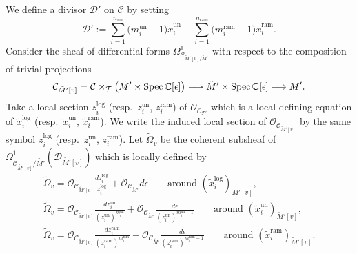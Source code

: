 \documentclass[pdftex]{sigma}
\numberwithin{equation}{section}
\newcommand\Spec{\mathop{\rm Spec}\nolimits}
\begin{document}
We define a divisor ${\mathcal D}'$ on ${\mathcal C}$
by setting
\[
 {\mathcal D}':=\sum_{i=1}^{n_{\mathrm{un}}} \big(m^{\mathrm{un}}_i-1\big)\tilde{x}_i^{\mathrm{un}}
 +\sum_{i=1}^{n_{\mathrm{ram}}} \big(m^{\mathrm{ram}}_i-1\big)\tilde{x}_i^{\mathrm{ram}}.
\]
Consider the sheaf of differential forms
$\Omega^1_{{\mathcal C}_{\tilde{M}'[v]/\tilde{M}'}}$
with respect to the composition of trivial projections
\[
 {\mathcal C}_{\tilde{M}'[v]}
 ={\mathcal C}\times_{\mathcal T}\big(\tilde{M}'\times\Spec\mathbb{C}[\epsilon]\big)
 \longrightarrow
 \tilde{M}'\times\Spec\mathbb{C}[\epsilon]\longrightarrow M'.
\]
Take a local section $z_i^{\mathrm{log}}$
(resp.\ $z_i^{\mathrm{un}}$, $z_i^{\mathrm{ram}}$)
of ${\mathcal O}_{{\mathcal C}_{\mathcal T'}}$
which is a local defining equation of
$\tilde{x}_i^{\mathrm{log}}$
(resp.\ $\tilde{x}_i^{\mathrm{un}}$, $\tilde{x}_i^{\mathrm{ram}}$).
We write the induced local section of
${\mathcal O}_{{\mathcal C}_{\tilde{M}'[v]}}$
by the same symbol $z_i^{\mathrm{log}}$
(resp.\ $z_i^{\mathrm{un}}$, $z_i^{\mathrm{ram}}$).
Let
$\tilde{\Omega}_v$
be the coherent subsheaf of
$\Omega^1_{{\mathcal C}_{\tilde{M'}[v]}/\tilde{M'}}({\mathcal D}_{\tilde{M'}[v]})$
which is locally defined by
\begin{gather}
 \tilde{\Omega}_v
 =
 {\mathcal O}_{{\mathcal C}_{\tilde{M}'[v]}} \frac{dz_i^{\mathrm{reg}}} {z_i^{\mathrm{log}}}
 +{\mathcal O}_{{\mathcal C}_{\tilde{M}'}} d\epsilon
 \qquad \text{around $(\tilde{x}_i^{\mathrm{log}})_{\tilde{M}'[v]}$},
 \nonumber\\
 \tilde{\Omega}_v
=
 {\mathcal O}_{{\mathcal C}_{\tilde{M}'[v]}}
 \frac{dz_i^{\mathrm{un}}} {(z_i^{\mathrm{un}})^{m^{\mathrm{un}}_i}}
 +{\mathcal O}_{{\mathcal C}_{\tilde{M}'}}
 \frac{d\epsilon} {(z_i^{\mathrm{un}})^{m^{\mathrm{un}}_i-1}}
 \qquad
\text{around $(\tilde{x}_i^{\mathrm{un}})_{\tilde{M}'[v]}$},
 \nonumber\\
 \tilde{\Omega}_v
 =
 {\mathcal O}_{{\mathcal C}_{\tilde{M}'[v]}}
 \frac{dz_i^{\mathrm{ram}}} {(z_i^{\mathrm{ram}})^{m^{\mathrm{ram}}_i}}
 +{\mathcal O}_{{\mathcal C}_{\tilde{M}'}}
 \frac{d\epsilon} {(z_i^{\mathrm{ram}})^{m^{\mathrm{ram}}_i-1}}
 \qquad
\text{around $(\tilde{x}_i^{\mathrm{ram}})_{\tilde{M}'[v]}$}.\label{equation: definition of total differential}
\end{gather}
\end{document}
